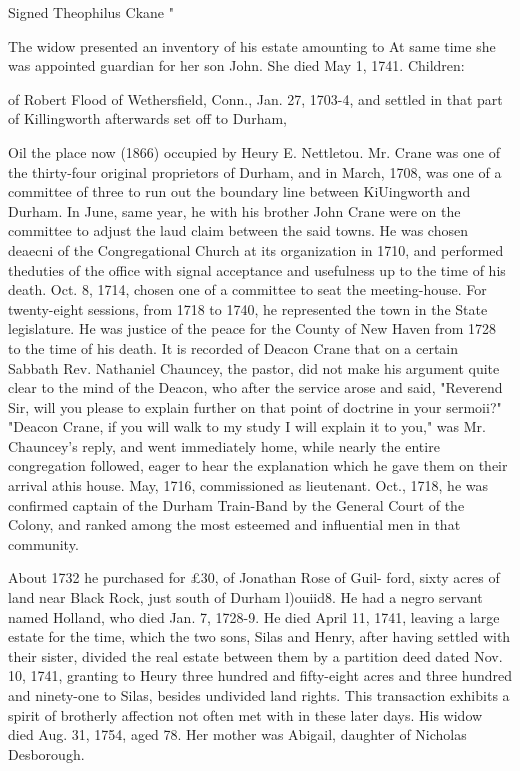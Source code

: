 \documentclass[oneside]{book}
\begin{document}
Signed Theophilus Ckane " 

The widow presented an inventory of his estate amounting to 
At same time she was appointed guardian for her son John. She 
died May 1, 1741. Children: 








of Robert Flood of Wethersfield, Conn., Jan. 27, 1703-4, and 
settled in that part of Killingworth afterwards set off to Durham, 




Oil the place now (1866) occupied by Heury E. Nettletou. Mr. 
Crane was one of the thirty-four original proprietors of Durham, 
and in March, 1708, was one of a committee of three to run out 
the boundary line between KiUingworth and Durham. In June, 
same year, he with his brother John Crane were on the committee 
to adjust the laud claim between the said towns. He was chosen 
deaecni of the Congregational Church at its organization in 1710, 
and performed theduties of the office with signal acceptance and 
usefulness up to the time of his death. Oct. 8, 1714, chosen one 
of a committee to seat the meeting-house. For twenty-eight 
sessions, from 1718 to 1740, he represented the town in the State 
legislature. He was justice of the peace for the County of New 
Haven from 1728 to the time of his death. It is recorded of 
Deacon Crane that on a certain Sabbath Rev. Nathaniel Chauncey, 
the pastor, did not make his argument quite clear to the mind of 
the Deacon, who after the service arose and said, "Reverend Sir, 
will you please to explain further on that point of doctrine in 
your sermoii?" "Deacon Crane, if you will walk to my study I 
will explain it to you," was Mr. Chauncey's reply, and went 
immediately home, while nearly the entire congregation followed, 
eager to hear the explanation which he gave them on their arrival 
athis house. May, 1716, commissioned as lieutenant. Oct., 
1718, he was confirmed captain of the Durham Train-Band by the 
General Court of the Colony, and ranked among the most esteemed 
and influential men in that community. 

About 1732 he purchased for £30, of Jonathan Rose of Guil- 
ford, sixty acres of land near Black Rock, just south of Durham 
l)ouiid8. He had a negro servant named Holland, who died Jan. 
7, 1728-9. He died April 11, 1741, leaving a large estate for 
the time, which the two sons, Silas and Henry, after having 
settled with their sister, divided the real estate between them by 
a partition deed dated Nov. 10, 1741, granting to Heury three 
hundred and fifty-eight acres and three hundred and ninety-one 
to Silas, besides undivided land rights. This transaction exhibits 
a spirit of brotherly affection not often met with in these later 
days. His widow died Aug. 31, 1754, aged 78. Her mother 
was Abigail, daughter of Nicholas Desborough. 
\end{document}
